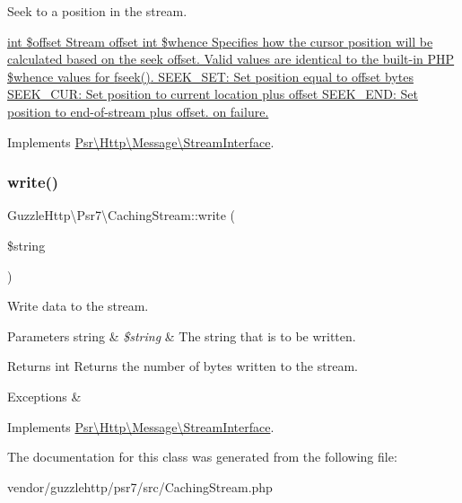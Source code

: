 Seek to a position in the stream.

\hyperlink{}{int \$offset Stream offset  int \$whence Specifies how the cursor position will be calculated based on the seek offset. Valid values are identical to the built-\/in P\+HP \$whence values for {\ttfamily fseek()}. S\+E\+E\+K\+\_\+\+S\+E\+T\+: Set position equal to offset bytes S\+E\+E\+K\+\_\+\+C\+U\+R\+: Set position to current location plus offset S\+E\+E\+K\+\_\+\+E\+N\+D\+: Set position to end-\/of-\/stream plus offset.   on failure. }

Implements \hyperlink{interfacePsr_1_1Http_1_1Message_1_1StreamInterface_a96ee062dc6cf4022d655dd15eaa81208}{Psr\textbackslash{}\+Http\textbackslash{}\+Message\textbackslash{}\+Stream\+Interface}.

\mbox{\label{classGuzzleHttp_1_1Psr7_1_1CachingStream_a8a6d9a820f1a4e50bbb965febb5acc36}} 
\subsubsection{\texorpdfstring{write()}{write()}}
{\footnotesize\ttfamily Guzzle\+Http\textbackslash{}\+Psr7\textbackslash{}\+Caching\+Stream\+::write (\begin{DoxyParamCaption}\item[{}]{\$string }\end{DoxyParamCaption})}

Write data to the stream.


\begin{DoxyParams}[1]{Parameters}
string & {\em \$string} & The string that is to be written. \\
\hline
\end{DoxyParams}
\begin{DoxyReturn}{Returns}
int Returns the number of bytes written to the stream. 
\end{DoxyReturn}

\begin{DoxyExceptions}{Exceptions}
{\em } & \\
\hline
\end{DoxyExceptions}


Implements \hyperlink{interfacePsr_1_1Http_1_1Message_1_1StreamInterface_aabf9fe3e09f85753834cdb69bbdf3c3d}{Psr\textbackslash{}\+Http\textbackslash{}\+Message\textbackslash{}\+Stream\+Interface}.



The documentation for this class was generated from the following file\+:\begin{DoxyCompactItemize}
\item 
vendor/guzzlehttp/psr7/src/Caching\+Stream.\+php\end{DoxyCompactItemize}
